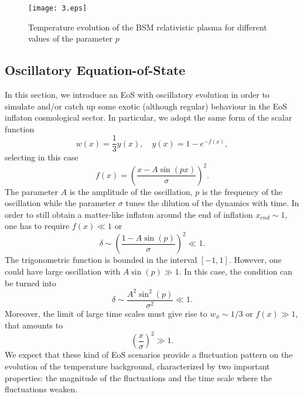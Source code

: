\documentclass[%
aps,prd,nofootinbib,showkeys,a4paper,10pt
]{revtex4-2}
\begin{document}
\begin{figure}%
\centering
\hspace*{-1cm}
\texttt{[image: 3.eps]}
\caption{Temperature evolution of the BSM relativistic plasma for different values of the parameter $p$}
\label{fig: 3}
\end{figure}



\subsection{Oscillatory Equation-of-State}


In this section, we introduce an EoS with oscillatory evolution in order to simulate and/or catch up some exotic 
(although regular) behaviour in the EoS inflaton cosmological sector.   
In particular, we adopt the same form of the scalar function
\begin{equation}
w(x)=\frac{1}{3}y(x), \quad y(x)= 1 - e^{-f(x)} ,
\end{equation}
selecting in this case
\begin{equation}
f(x)=\left(\frac{x-A\sin(px)}{\sigma}\right)^2 .
\end{equation}
The parameter $A$ is the amplitude of the oscillation, $p$ is the frequency of the oscillation while the parameter $\sigma$
tunes the dilution of the dynamics with time.  
In order to still obtain a matter-like inflaton around the end of inflation $x_{end}\sim 1$, one has to require $f(x)\ll 1$ or
\begin{equation}\label{eqn: small time prescription}
\delta\sim\left(\frac{1 - A\sin(p) }{\sigma}\right)^2\ll 1.
\end{equation}
The trigonometric function is bounded in the interval $[-1,1]$. 
However, one could have large oscillation with $A\sin(p)\gg 1$.  
In this case, the condition can be turned into
\begin{equation}
\delta\sim\frac{A^2\sin^2(p)}{\sigma^2}\ll 1.
\end{equation}
Moreover, the limit of large time scales must give rise to $w_{\phi}\sim 1/3$ or $f(x)\gg 1$, that amounts to
\begin{equation}\label{eqn: large time prescription}
\left(\frac{x}{\sigma}\right)^2\gg 1.
\end{equation}
We expect that these kind of EoS scenarios provide a fluctuation pattern on the evolution of the temperature background, 
characterized by two important properties: the magnitude of the fluctuations and the time scale where the fluctuations weaken.
\end{document}
